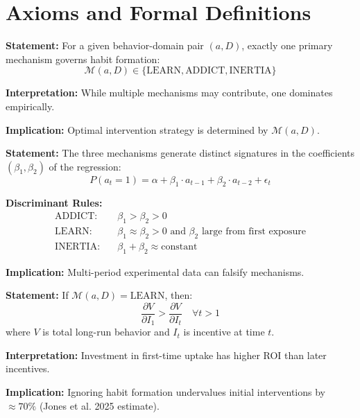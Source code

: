 \section{Axioms and Formal Definitions}
\label{sec:hf-axioms}

\begin{tcolorbox}[colback=gray!5!white, colframe=gray!75!black,
    title=Axiom HF-1: Mechanism Exclusivity (Local)]
\textbf{Statement:} For a given behavior-domain pair $(a, D)$, exactly one primary mechanism
governs habit formation:
\begin{equation}
\mathcal{M}(a, D) \in \{\text{LEARN}, \text{ADDICT}, \text{INERTIA}\}
\end{equation}

\textbf{Interpretation:} While multiple mechanisms may contribute, one dominates empirically.

\textbf{Implication:} Optimal intervention strategy is determined by $\mathcal{M}(a, D)$.
\end{tcolorbox}

\begin{tcolorbox}[colback=gray!5!white, colframe=gray!75!black,
    title=Axiom HF-2: Temporal Discriminant]
\textbf{Statement:} The three mechanisms generate distinct signatures in the coefficients
$(\beta_1, \beta_2)$ of the regression:
\begin{equation}
P(a_t = 1) = \alpha + \beta_1 \cdot a_{t-1} + \beta_2 \cdot a_{t-2} + \epsilon_t
\end{equation}

\textbf{Discriminant Rules:}
\begin{align}
\text{ADDICT:} & \quad \beta_1 > \beta_2 > 0 \\
\text{LEARN:} & \quad \beta_1 \approx \beta_2 > 0 \text{ and } \beta_2 \text{ large from first exposure} \\
\text{INERTIA:} & \quad \beta_1 + \beta_2 \approx \text{constant}
\end{align}

\textbf{Implication:} Multi-period experimental data can falsify mechanisms.
\end{tcolorbox}

\begin{tcolorbox}[colback=gray!5!white, colframe=gray!75!black,
    title=Axiom HF-3: Front-Loading Principle]
\textbf{Statement:} If $\mathcal{M}(a, D) = \text{LEARN}$, then:
\begin{equation}
\frac{\partial V}{\partial I_1} > \frac{\partial V}{\partial I_t} \quad \forall t > 1
\end{equation}
where $V$ is total long-run behavior and $I_t$ is incentive at time $t$.

\textbf{Interpretation:} Investment in first-time uptake has higher ROI than later incentives.

\textbf{Implication:} Ignoring habit formation undervalues initial interventions by $\approx 70\%$
(Jones et al. 2025 estimate).
\end{tcolorbox}

